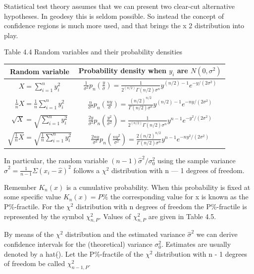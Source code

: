 	Statistical test theory assumes that we can present two clear-cut alternative hypotheses. In
	geodesy this is seldom possible. So instead the concept of confidence regions is much more
	used, and that brings the x 2 distribution into play.
	\begin{table}
		Table 4.4 Random variables and their probability densities\\
		\centering
		\begin{tabular}{c c}
			\hline 
			Random variable & Probability density when $y_i$ are $N(0,\sigma^2)$ \\ 
			\hline 
			$X=\sum^n_{i=1}y^2_i$ & $\frac{1}{\sigma^2}p_n(\frac{y}{\sigma})=\frac{1}{2^(n/2)\Gamma(n/2)\sigma^n}y^{(n/2)-1}e^{-y/(2\sigma^2)}$ \\ 
			$\frac{1}{n}X=\frac{1}{n}\sum^n_{i=1}y^2_i$ &  
			$\frac{n}{\sigma^2}p_n(\frac{ny}{\sigma})=\frac{(n/2)^{n/2}}{\Gamma(n/2)\sigma^n}y^{(n/2)-1}e^{-ny/(2\sigma^2)}$ \\ 
			$\sqrt{X}=\sqrt{\sum^n_{i=1}y^2_i}$ &
			$\frac{2y}{\sigma^2}p_n(\frac{y^2}{\sigma^2})=\frac{1}{2^(n/2)\Gamma(n/2)\sigma^n}y^{n-1}e^{-y^2/(2\sigma^2)}$  \\ 
			$\sqrt{\frac{1}{n}X}=\sqrt{\frac{1}{n}\sum^n_{i=1}y^2_i}$ & 
			$\frac{2ny}{\sigma^2}p_n(\frac{ny^2}{\sigma^2})=\frac{2(n/2)^{n/2}}{\Gamma(n/2)\sigma^n}y^{n-1}e^{-ny^2/(2\sigma^2)}$  \\ 
			\hline 
		\end{tabular} 
	\end{table}
	
	
	In particular, the random variable $(n-1)\hat{\sigma}^2/\sigma^2_0$ using the sample variance
	$\hat{\sigma}^2=\frac{1}{n-1}\Sigma(x_i-\hat{x})^2$ follows a $\chi^2$ distribution with n — 1 degrees of freedom.
	
	Remember $K_n(x)$ is a cumulative probability. When this probability is fixed at some
	specific value $K_n(x)=P\%$ the corresponding value for x is known as the P\%-fractile.
	For the $\chi^2$ distribution with n degrees of freedom the P\%-fractile is represented by the
	symbol $\chi^2_{n,P}$. Values of $\chi^2_{n,P}$ are given in Table 4.5.
	
	By means of the $\chi^2$ distribution and the estimated variance $\hat{\sigma}^2$ we can derive confidence intervals for the (theoretical) variance $\sigma^2_0$. Estimates are usually denoted by a hat($\hat{}$).	Let the P\%-fractile of the $\chi^2$ distribution with n - 1 degrees of freedom be called $\chi^2_{n-1,P}$.
	
